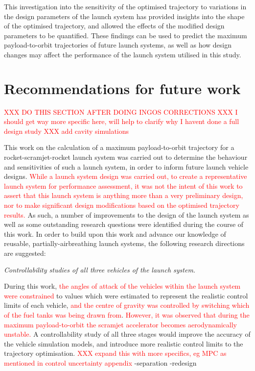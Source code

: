 This investigation into the sensitivity of the optimised trajectory to variations in the design parameters of the launch system has provided insights into the shape of the optimised trajectory, and allowed the effects of the modified design parameters to be quantified. These findings can be used to predict the maximum payload-to-orbit trajectories of future launch systems, as well as how design changes may affect the performance of the launch system utilised in this study. 


  \chapter{Recommendations for future work}
   \textcolor{red}{XXX DO THIS SECTION AFTER DOING INGOS CORRECTIONS}
  \textcolor{red}{XXX I should get way more specific here, will help to clarify why I havent done a full design study}
  \textcolor{red}{XXX add cavity simulations}
  	
 This work on the calculation of a maximum payload-to-orbit trajectory for a rocket-scramjet-rocket launch system was carried out to determine the behaviour and sensitivities of such a launch system, in order to inform future launch vehicle designs. 
  \textcolor{red}{While a launch system design was carried out, to create a representative launch system for performance assessment, it was not the intent of this work to assert that this launch system is anything more than a very preliminary design, nor to make significant design modifications based on the optimised trajectory results.}
 As such, a number of improvements to the design of the launch system as well as some outstanding research questions were identified during the course of this work.
 In order to build upon this work and advance our knowledge of reusable, partially-airbreathing launch systems, the following research directions are suggested:

\vspace{10pt}
\textit{Controllability studies of all three vehicles of the launch system.}

 \noindent
During this work, \textcolor{red}{the angles of attack of the vehicles within the launch system were constrained} to values which were estimated to represent the realistic control limits of each vehicle, \textcolor{red}{and the centre of gravity was controlled by switching which of the fuel tanks was being drawn from}. \textcolor{red}{However, it was observed that during the maximum payload-to-orbit the scramjet accelerator becomes aerodynamically unstable.}
A controllability study of all three stages would improve the accuracy of the vehicle simulation models, and introduce more realistic control limits to the trajectory optimisation.  \textcolor{red}{XXX expand this with more specifics, eg MPC as mentioned in control uncertainty appendix}
-separation
-redesign

